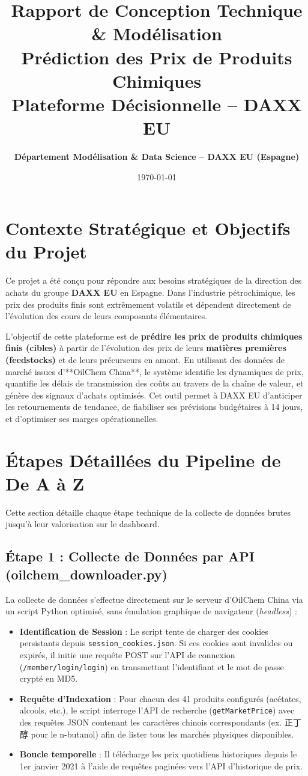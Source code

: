 \documentclass[12pt,a4paper]{article}
\title{\textbf{Rapport de Conception Technique \& Modélisation \\ Prédiction des Prix de Produits Chimiques\\ Plateforme Décisionnelle -- DAXX EU}}
\author{\textbf{Département Modélisation \& Data Science -- DAXX EU (Espagne)}}
\date{\today}
\begin{document}
\maketitle
\tableofcontents
\newpage

\section{Contexte Stratégique et Objectifs du Projet}
Ce projet a été conçu pour répondre aux besoins stratégiques de la direction des achats du groupe \textbf{DAXX EU} en Espagne. Dans l'industrie pétrochimique, les prix des produits finis sont extrêmement volatils et dépendent directement de l'évolution des cours de leurs composants élémentaires.

L'objectif de cette plateforme est de \textbf{prédire les prix de produits chimiques finis (cibles)} à partir de l'évolution des prix de leurs \textbf{matières premières (feedstocks)} et de leurs précurseurs en amont. En utilisant des données de marché issues d'**OilChem China**, le système identifie les dynamiques de prix, quantifie les délais de transmission des coûts au travers de la chaîne de valeur, et génère des signaux d'achats optimisés. Cet outil permet à DAXX EU d'anticiper les retournements de tendance, de fiabiliser ses prévisions budgétaires à 14 jours, et d'optimiser ses marges opérationnelles.

\section{Étapes Détaillées du Pipeline de De A à Z}
Cette section détaille chaque étape technique de la collecte de données brutes jusqu'à leur valorisation sur le dashboard.

\subsection{Étape 1 : Collecte de Données par API (oilchem\_downloader.py)}
La collecte de données s'effectue directement sur le serveur d'OilChem China via un script Python optimisé, sans émulation graphique de navigateur (\textit{headless}) :
\begin{itemize}
    \item \textbf{Identification de Session} : Le script tente de charger des cookies persistants depuis \texttt{session\_cookies.json}. Si ces cookies sont invalides ou expirés, il initie une requête POST sur l'API de connexion (\texttt{/member/login/login}) en transmettant l'identifiant et le mot de passe crypté en MD5.
    \item \textbf{Requête d'Indexation} : Pour chacun des 41 produits configurés (acétates, alcools, etc.), le script interroge l'API de recherche (\texttt{getMarketPrice}) avec des requêtes JSON contenant les caractères chinois correspondants (ex. 正丁醇 pour le n-butanol) afin de lister tous les marchés physiques disponibles.
    \item \textbf{Boucle temporelle} : Il télécharge les prix quotidiens historiques depuis le 1er janvier 2021 à l'aide de requêtes paginées vers l'API d'historique de prix.
\end{itemize}
\end{document}
